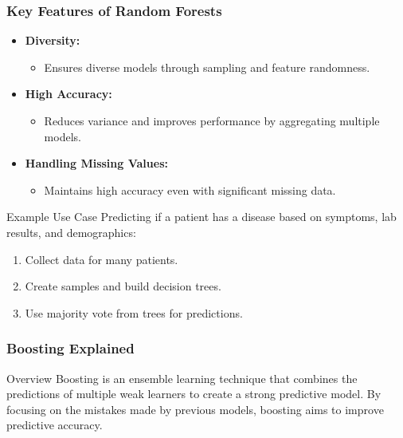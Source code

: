\documentclass[aspectratio=169]{beamer}
\begin{document}
\begin{frame}[fragile]
    \frametitle{Key Features of Random Forests}

    \begin{itemize}
        \item \textbf{Diversity:} 
        \begin{itemize}
            \item Ensures diverse models through sampling and feature randomness.
        \end{itemize}
        
        \item \textbf{High Accuracy:} 
        \begin{itemize}
            \item Reduces variance and improves performance by aggregating multiple models.
        \end{itemize}

        \item \textbf{Handling Missing Values:} 
        \begin{itemize}
            \item Maintains high accuracy even with significant missing data.
        \end{itemize}
    \end{itemize}

    \begin{block}{Example Use Case}
        Predicting if a patient has a disease based on symptoms, lab results, and demographics:
        \begin{enumerate}
            \item Collect data for many patients.
            \item Create samples and build decision trees.
            \item Use majority vote from trees for predictions.
        \end{enumerate}
    \end{block}

\end{frame}

\begin{frame}[fragile]
    \frametitle{Boosting Explained}
    \begin{block}{Overview}
        Boosting is an ensemble learning technique that combines the predictions of multiple weak learners to create a strong predictive model. By focusing on the mistakes made by previous models, boosting aims to improve predictive accuracy. 
    \end{block}
\end{frame}
\end{document}

